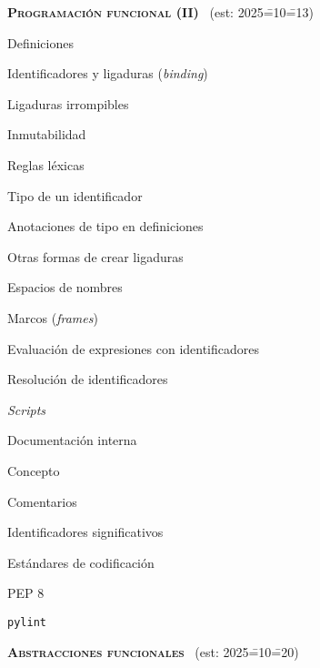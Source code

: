 \begin{longenum}
    \item \textbf{\textsc{Programación funcional (II)}} \ (est: 2025\==10\==13)
    \begin{longenum}
        \item Definiciones
        \begin{longenum}
            \item Identificadores y ligaduras (\textit{binding})
            \begin{longenum}
                \item Ligaduras irrompibles
                \item Inmutabilidad
                \item Reglas léxicas
                \item Tipo de un identificador
                \item Anotaciones de tipo en definiciones
                \item Otras formas de crear ligaduras
            \end{longenum}
            \item Espacios de nombres
            \item Marcos (\textit{frames})
            \item Evaluación de expresiones con identificadores
            \begin{longenum}
                \item Resolución de identificadores
            \end{longenum}
        \end{longenum}
        \item \textit{Scripts}
        \item Documentación interna
        \begin{longenum}
            \item Concepto
            \item Comentarios
            \item Identificadores significativos
            \item Estándares de codificación
            \begin{longenum}
                \item PEP 8
                \item \texttt{pylint}
            \end{longenum}
        \end{longenum}
    \end{longenum}
    \item \textbf{\textsc{Abstracciones funcionales}} \ (est: 2025\==10\==20)

\end{longenum}
